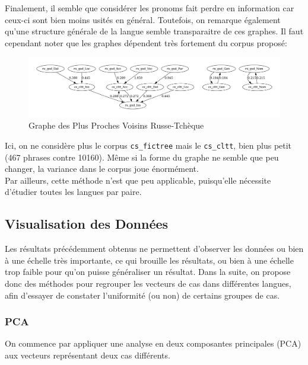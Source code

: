 \documentclass{cours}
\begin{document}
Finalement, il semble que considérer les pronoms fait perdre en information car ceux-ci sont bien moins usités en général. Toutefois, on remarque également qu'une structure générale de la langue semble transparaitre de ces graphes.
Il faut cependant noter que les graphes dépendent très fortement du corpus proposé:

\begin{figure}[H]
	\centering
	\includegraphics[width=\textwidth]{Figures/GNN/gnn_ru_gsd_cs_cltt}
	\caption{Graphe des Plus Proches Voisins Russe-Tchèque}
\end{figure}

Ici, on ne considère plus le corpus \texttt{cs\_fictree} mais le \texttt{cs\_cltt}, bien plus petit (467 phrases contre 10160).
Même si la forme du graphe ne semble que peu changer, la variance dans le corpus joue énormément.\\
Par ailleurs, cette méthode n'est que peu applicable, puisqu'elle nécessite d'étudier toutes les langues par paire.

\subsection{Visualisation des Données}
Les résultats précédemment obtenus ne permettent d'observer les données ou bien à une échelle très importante, ce qui brouille les résultats, ou bien à une échelle trop faible pour qu'on puisse généraliser un résultat.
Dans la suite, on propose donc des méthodes pour regrouper les vecteurs de cas dans différentes langues, afin d'essayer de constater l'uniformité (ou non) de certains groupes de cas.

\subsubsection{PCA}
On commence par appliquer une analyse en deux composantes principales (PCA) aux vecteurs représentant deux cas différents.
\end{document}
